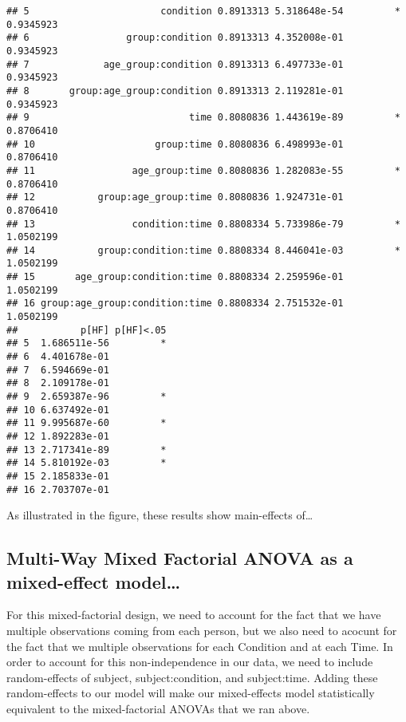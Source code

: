 \documentclass[]{article}
\begin{document}
\begin{verbatim}
## 5                       condition 0.8913313 5.318648e-54         * 0.9345923
## 6                 group:condition 0.8913313 4.352008e-01           0.9345923
## 7             age_group:condition 0.8913313 6.497733e-01           0.9345923
## 8       group:age_group:condition 0.8913313 2.119281e-01           0.9345923
## 9                            time 0.8080836 1.443619e-89         * 0.8706410
## 10                     group:time 0.8080836 6.498993e-01           0.8706410
## 11                 age_group:time 0.8080836 1.282083e-55         * 0.8706410
## 12           group:age_group:time 0.8080836 1.924731e-01           0.8706410
## 13                 condition:time 0.8808334 5.733986e-79         * 1.0502199
## 14           group:condition:time 0.8808334 8.446041e-03         * 1.0502199
## 15       age_group:condition:time 0.8808334 2.259596e-01           1.0502199
## 16 group:age_group:condition:time 0.8808334 2.751532e-01           1.0502199
##           p[HF] p[HF]<.05
## 5  1.686511e-56         *
## 6  4.401678e-01          
## 7  6.594669e-01          
## 8  2.109178e-01          
## 9  2.659387e-96         *
## 10 6.637492e-01          
## 11 9.995687e-60         *
## 12 1.892283e-01          
## 13 2.717341e-89         *
## 14 5.810192e-03         *
## 15 2.185833e-01          
## 16 2.703707e-01
\end{verbatim}

As illustrated in the figure, these results show main-effects of\ldots{}

\hypertarget{multi-way-mixed-factorial-anova-as-a-mixed-effect-model}{%
\subsection{Multi-Way Mixed Factorial ANOVA as a mixed-effect
model\ldots{}}\label{multi-way-mixed-factorial-anova-as-a-mixed-effect-model}}

For this mixed-factorial design, we need to account for the fact that we
have multiple observations coming from each person, but we also need to
acocunt for the fact that we multiple observations for each Condition
and at each Time. In order to account for this non-independence in our
data, we need to include random-effects of subject, subject:condition,
and subject:time. Adding these random-effects to our model will make our
mixed-effects model statistically equivalent to the mixed-factorial
ANOVAs that we ran above.
\end{document}
